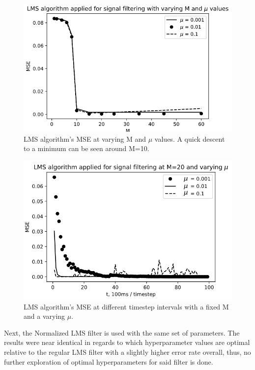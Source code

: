 \documentclass[10pt,a4paper,twocolumn]{article}
\begin{document}
\begin{figure} %
	[!h]
	\centering
	\includegraphics*[width=.8\columnwidth]{f3.png} %
	\caption{LMS algorithm's MSE at varying M and $\mu$ values. A quick descent to a minimum can be seen around M=10.}
	\label{f3}
	\vspace{6pt}
\end{figure}

\begin{figure} %
	[!h]
	\centering
	\includegraphics*[width=.8\columnwidth]{f4.png} %
	\caption{LMS algorithm's MSE at different timestep intervals with a fixed M and a varying $\mu$.}
	\label{f4}
	\vspace{6pt}
\end{figure}

Next, the Normalized LMS filter is used with the same set of parameters. The results were near identical in regards to which hyperparameter values are optimal relative to the regular LMS filter with a slightly higher error rate overall, thus, no further exploration of optimal hyperparameters for said filter is done.
\end{document}
